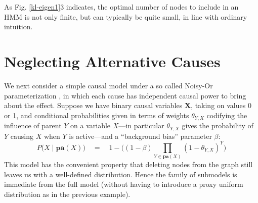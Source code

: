 \documentclass[10pt,letterpaper]{article}
\begin{document}
As Fig. \ref{kl-eigen1}3 indicates, the optimal number of nodes to include in an HMM is not only finite, but can typically be quite small, in line with ordinary intuition.

\section{Neglecting Alternative Causes}

We next consider a simple causal model under a so called Noisy-Or parameterization \citep{Cheng}, in which each cause has independent causal power to bring about the effect. Suppose we have binary causal variables $\textbf{X}$, taking on values 0 or 1, and conditional probabilities given in terms of weights $\theta_{Y,X}$ codifying the influence of parent $Y$ on a variable $X$---in particular $\theta_{Y,X}$ gives the probability of $Y$ causing $X$ when $Y$ is active---and a ``background bias'' parameter $\beta$: $$P\big(X\mid \textbf{pa}(X)\big) \quad = \quad 1-\Big((1-\beta)\prod_{Y \in \textbf{pa}(X)} (1-\theta_{Y,X})^Y\Big)$$
This model has the convenient property that deleting nodes from the graph still leaves us with a well-defined distribution. Hence the family of submodels is immediate from the full model (without having to introduce a proxy uniform distribution as in the previous example).
\end{document}
